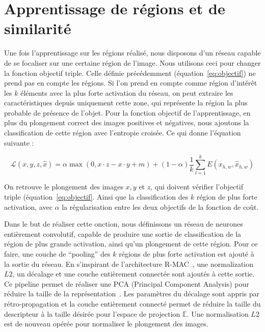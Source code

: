 \section{Apprentissage de régions et de similarité}

Une fois l'apprentissage sur les régions réalisé, nous disposons d'un réseau capable de se focaliser sur une certaine région de l'image.
Nous utilisons ceci pour changer la fonction objectif triple.
Celle définie précédemment (équation~\ref{eq:objectif}) ne prend pas en compte les régions.
Si l'on prend en compte comme région d'intérêt les $k$ éléments avec la plus forte activation du réseau, on peut extraire les caractéristiques depuis uniquement cette zone, qui représente la région la plus probable de présence de l'objet.
Pour la fonction objectif de l'apprentissage, en plus du plongement correct des images positives et négatives, nous ajoutons la classification de cette région avec l'entropie croisée.
Ce qui donne l'équation suivante :

\begin{equation}
\mathcal{L}(x,y,z,\hat{x}) =  \alpha \max(0, x \cdot z - x \cdot y + m) +
(1-\alpha) \frac{1}{k} \sum_{l=1}^k E(x_{h,w}, \hat{x}_{h,w})
\label{eq:proposedloss}
\end{equation}

On retrouve le plongement des images $x,y$ et $z$, qui doivent vérifier l'objectif triple (équation~\ref{eq:objectif}.
Ainsi que la classification des $k$ région de plus forte activation, avec $\alpha$ la régularisation entre les deux objectifs de la fonction de coût.

Dans le but de réaliser cette onction, nous définissons un réseau de neurones entièrement convolutif, capable de produire une sortie de classification de la région de plus grande activation, ainsi qu'un plongement de cette région.
Pour ce faire, une couche de ``pooling'' des $k$ régions de plus forte activation est ajouté à la sortie du réseau. 
En s'inspirant de l'architecture R-MAC~\cite{gordo2016deep}, une normalization $L2$, un décalage et une couche entièrement connectée sont ajoutés à cette sortie.
Ce pipeline permet de réaliser une PCA (Principal Component Analysis) pour réduire la taille de la représentation~\cite{jegou2012negative}.
Les paramètres du décalage sont appris par rétro-propagation et la couche entièrement connecté permet de réduire la taille du descripteur à la taille désirée pour l'espace de projection $\mathbb{E}$.
Une normalisation $L2$ est de nouveau opérée pour normaliser le plongement des images.

